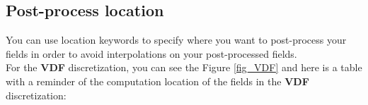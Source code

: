 \subsection{Post-process location}
You can use location keywords to specify where you want to post-process your fields in order to avoid interpolations on your post-processed fields.\\


For the \textbf{VDF} discretization, you can see the Figure \ref{fig_VDF} and here is a table with a reminder of the computation location of the fields in the \textbf{VDF} discretization:

